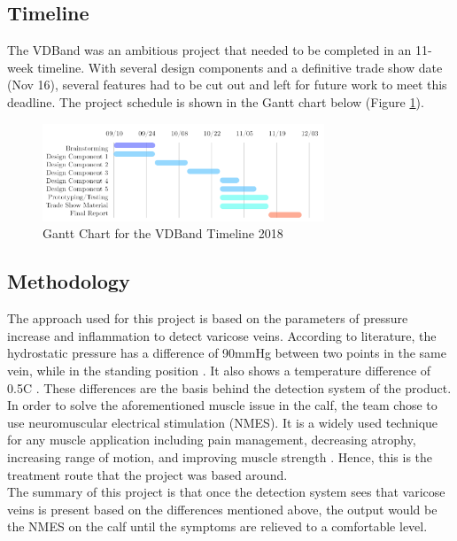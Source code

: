 \documentclass[11.5pt]{article}
\begin{document}
\subsection{Timeline}
The VDBand was an ambitious project that needed to be completed in an 11-week timeline. With several design components and a definitive trade show date (Nov 16), several features had to be cut out and left for future work to meet this deadline. The project schedule is shown in the Gantt chart below (Figure \ref{fig:gantt}).

\begin{figure}[H]
    \centering
    \includegraphics[width=0.75\textwidth]{motivation/gantt-psd-2.png}
    \caption{Gantt Chart for the VDBand Timeline 2018}
    \label{fig:gantt}
\end{figure}

\subsection{Methodology}
The approach used for this project is based on the parameters of pressure increase and inflammation to detect varicose veins. According to literature, the hydrostatic pressure has a difference of 90mmHg between two points in the same vein, while in the standing position \cite{press, press2}. It  also shows a temperature difference of 0.5\degree C \cite{Shaydakov}. These differences are the basis behind the detection system of the product. \\

In order to solve the aforementioned muscle issue in the calf, the team chose to use neuromuscular electrical stimulation (NMES). It is a widely used technique for any muscle application including pain management, decreasing atrophy, increasing range of motion, and improving muscle strength \cite{Doucet}. Hence, this is the treatment route that the project was based around. \\

The summary of this project is that once the detection system sees that varicose veins is present based on the differences mentioned above, the output would be the NMES on the calf until the symptoms are relieved to a comfortable level. 
\end{document}

